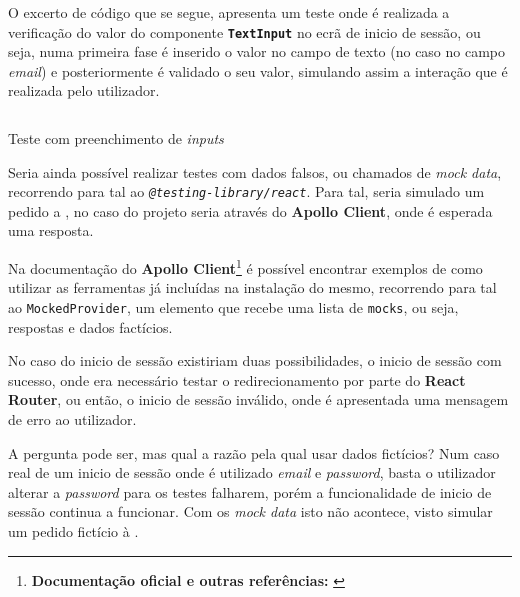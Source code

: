 O excerto de código que se segue, apresenta um teste onde é realizada a verificação do valor do componente \textbf{\texttt{TextInput}} no ecrã de inicio de sessão, ou seja, numa primeira fase é inserido o valor no campo de texto (no caso no campo \textit{email}) e posteriormente é validado o seu valor, simulando assim a interação que é realizada pelo utilizador.

\begin{longlisting}
	\inputminted[]{jsx}{code/tests/insert-text-input.test.tsx}
	\caption{Teste com preenchimento de \textit{inputs}}
\end{longlisting}

Seria ainda possível realizar testes com dados falsos, ou chamados de \textit{mock data}, recorrendo para tal ao \textit{ \texttt{@testing-library/react}}. Para tal, seria simulado um pedido a \textbf{}, no caso do projeto seria através do \textbf{Apollo Client}, onde é esperada uma resposta.

Na documentação do \textbf{Apollo Client}\footnote{\textbf{Documentação oficial e outras referências:} \cite{apolloTestsDocs,mockingApolloTesting,apolloTest,mockingData,mockingGraphql}} é possível encontrar exemplos de como utilizar as ferramentas já incluídas na instalação do mesmo, recorrendo para tal ao \texttt{MockedProvider}, um elemento que recebe uma lista de \texttt{mocks}, ou seja, respostas e dados factícios.

No caso do inicio de sessão existiriam duas possibilidades, o inicio de sessão com sucesso, onde era necessário testar o redirecionamento por parte do \textbf{React Router}, ou então, o inicio de sessão inválido, onde é apresentada uma mensagem de erro ao utilizador.

A pergunta pode ser, mas qual a razão pela qual usar dados fictícios? Num caso real de um inicio de sessão onde é utilizado \textit{email} e \textit{password}, basta o utilizador alterar a \textit{password} para os testes falharem, porém a funcionalidade de inicio de sessão continua a funcionar. Com os \textit{mock data} isto não acontece, visto simular um pedido fictício à \textbf{}.
